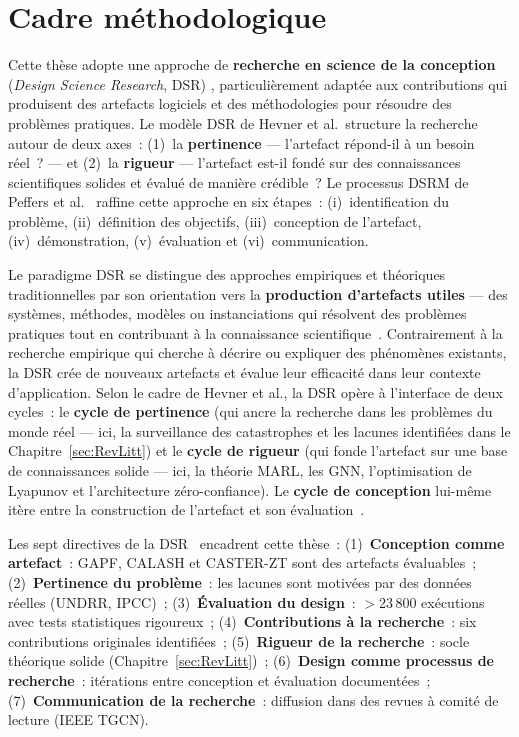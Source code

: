 \section{Cadre méthodologique}\label{sec:demarche-cadre}

Cette thèse adopte une approche de \textbf{recherche en science de la conception} (\emph{Design Science Research}, DSR) \cite{Hevner2004DesignScience, Peffers2007DSRM}, particulièrement adaptée aux contributions qui produisent des artefacts logiciels et des méthodologies pour résoudre des problèmes pratiques. Le modèle DSR de Hevner et al.\ structure la recherche autour de deux axes~: (1)~la \textbf{pertinence} --- l'artefact répond-il à un besoin réel~? --- et (2)~la \textbf{rigueur} --- l'artefact est-il fondé sur des connaissances scientifiques solides et évalué de manière crédible~? Le processus DSRM de Peffers et al.\ \cite{Peffers2007DSRM} raffine cette approche en six étapes~: (i)~identification du problème, (ii)~définition des objectifs, (iii)~conception de l'artefact, (iv)~démonstration, (v)~évaluation et (vi)~communication.

Le paradigme DSR se distingue des approches empiriques et théoriques traditionnelles par son orientation vers la \textbf{production d'artefacts utiles} --- des systèmes, méthodes, modèles ou instanciations qui résolvent des problèmes pratiques tout en contribuant à la connaissance scientifique~\cite{Hevner2004DesignScience}. Contrairement à la recherche empirique qui cherche à décrire ou expliquer des phénomènes existants, la DSR crée de nouveaux artefacts et évalue leur efficacité dans leur contexte d'application. Selon le cadre de Hevner et al., la DSR opère à l'interface de deux cycles~: le \textbf{cycle de pertinence} (qui ancre la recherche dans les problèmes du monde réel --- ici, la surveillance des catastrophes et les lacunes identifiées dans le Chapitre~\ref{sec:RevLitt}) et le \textbf{cycle de rigueur} (qui fonde l'artefact sur une base de connaissances solide --- ici, la théorie MARL, les GNN, l'optimisation de Lyapunov et l'architecture zéro-confiance). Le \textbf{cycle de conception} lui-même itère entre la construction de l'artefact et son évaluation~\cite{Hevner2004DesignScience}.

Les sept directives de la DSR~\cite{Hevner2004DesignScience} encadrent cette thèse~: (1)~\textbf{Conception comme artefact}~: GAPF, CALASH et CASTER-ZT sont des artefacts évaluables~; (2)~\textbf{Pertinence du problème}~: les lacunes sont motivées par des données réelles (UNDRR, IPCC)~; (3)~\textbf{Évaluation du design}~: $>$23\,800 exécutions avec tests statistiques rigoureux~; (4)~\textbf{Contributions à la recherche}~: six contributions originales identifiées~; (5)~\textbf{Rigueur de la recherche}~: socle théorique solide (Chapitre~\ref{sec:RevLitt})~; (6)~\textbf{Design comme processus de recherche}~: itérations entre conception et évaluation documentées~; (7)~\textbf{Communication de la recherche}~: diffusion dans des revues à comité de lecture (IEEE TGCN).

